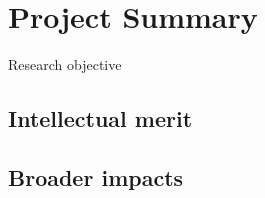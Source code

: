 \section{Project Summary}

Research objective

\subsection{Intellectual merit}

\subsection{Broader impacts}
  